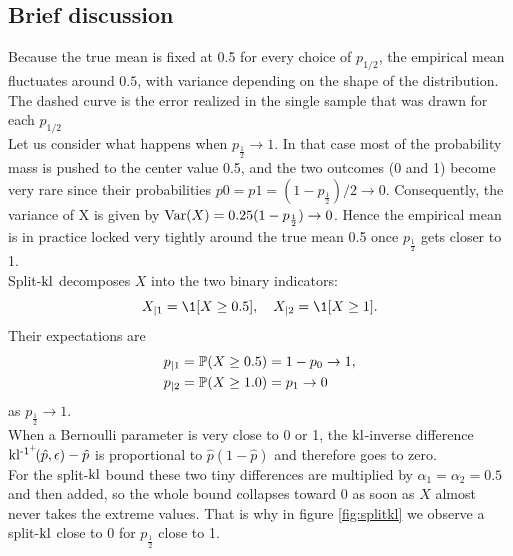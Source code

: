 \subsection*{Brief discussion}
Because the true mean is fixed at 0.5 for every choice of $p_{1/2}$, the empirical mean fluctuates around $0.5$, with variance depending on the shape of the distribution. 
\\[2mm]
The dashed curve is the error realized in the single sample that was drawn for each $p_{1/2}$
\\[2mm]
Let us consider what happens when $p_{\frac{1}{2}} \rightarrow 1$. In that case most of the probability mass is pushed to the center value 0.5, and the two outcomes (0 and 1) become very rare since their probabilities $p0 = p1 = (1-p_{\frac{1}{2}})/2 \rightarrow  0$. Consequently, the variance of X is given by $\Var(X)=0.25(1 -p_{\frac{1}{2}}) \rightarrow  0$. Hence the empirical mean is in practice locked very tightly around the true mean 0.5 once $p_{\frac{1}{2}}$ gets closer to 1.
\\[2mm]
Split-$\operatorname{kl}$ decomposes $X$ into the two binary indicators:
$$
X_{\mid 1} = \1[X \geq 0.5], \quad X_{\mid 2} = \1[X \geq 1].
$$
Their expectations are
\begin{align*}
    p_{\mid 1} &= \P(X \geq 0.5) = 1 - p_0  \rightarrow 1, \\
    p_{\mid 2} &= \P(X \geq 1.0) = p_1      \rightarrow 0
\end{align*}
as $p_{\frac{1}{2}} \rightarrow 1$.
\\[2mm]
When a Bernoulli parameter is very close to 0 or 1, the $\operatorname{kl}$-inverse difference $\operatorname{kl^{-1^+}\!}(\hat{p},\epsilon)-\hat{p}$ is proportional to $\hat{p}(1-\hat{p})$ and therefore goes to zero.
\\[2mm]
For the split-$\operatorname{kl}$ bound these two tiny differences are multiplied by $\alpha_1 = \alpha_2 = 0.5$ and then added, so the whole bound collapses toward 0 as soon as $X$ almost never takes the extreme values.
That is why in figure \ref{fig:splitkl} we observe a split-$\operatorname{kl}$ close to 0 for $p_{\frac{1}{2}}$ close to 1.

